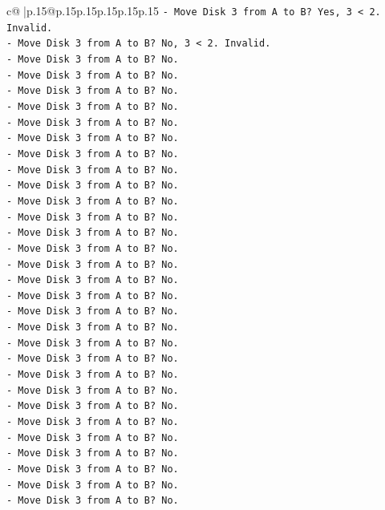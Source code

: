 \documentclass{article}
\begin{document}
{\begin{supertabular}{c@{$\;$}|p{.15\linewidth}@{}p{.15\linewidth}p{.15\linewidth}p{.15\linewidth}p{.15\linewidth}p{.15\linewidth}}
{{{\texttt{{-} Move Disk 3 from A to B? Yes, 3 < 2. Invalid.} \\
\texttt{{-} Move Disk 3 from A to B? No, 3 < 2. Invalid.} \\
\texttt{{-} Move Disk 3 from A to B? No.} \\
\texttt{{-} Move Disk 3 from A to B? No.} \\
\texttt{{-} Move Disk 3 from A to B? No.} \\
\texttt{{-} Move Disk 3 from A to B? No.} \\
\texttt{{-} Move Disk 3 from A to B? No.} \\
\texttt{{-} Move Disk 3 from A to B? No.} \\
\texttt{{-} Move Disk 3 from A to B? No.} \\
\texttt{{-} Move Disk 3 from A to B? No.} \\
\texttt{{-} Move Disk 3 from A to B? No.} \\
\texttt{{-} Move Disk 3 from A to B? No.} \\
\texttt{{-} Move Disk 3 from A to B? No.} \\
\texttt{{-} Move Disk 3 from A to B? No.} \\
\texttt{{-} Move Disk 3 from A to B? No.} \\
\texttt{{-} Move Disk 3 from A to B? No.} \\
\texttt{{-} Move Disk 3 from A to B? No.} \\
\texttt{{-} Move Disk 3 from A to B? No.} \\
\texttt{{-} Move Disk 3 from A to B? No.} \\
\texttt{{-} Move Disk 3 from A to B? No.} \\
\texttt{{-} Move Disk 3 from A to B? No.} \\
\texttt{{-} Move Disk 3 from A to B? No.} \\
\texttt{{-} Move Disk 3 from A to B? No.} \\
\texttt{{-} Move Disk 3 from A to B? No.} \\
\texttt{{-} Move Disk 3 from A to B? No.} \\
\texttt{{-} Move Disk 3 from A to B? No.} \\
\texttt{{-} Move Disk 3 from A to B? No.} \\
\texttt{{-} Move Disk 3 from A to B? No.} \\
\texttt{{-} Move Disk 3 from A to B? No.} \\
\texttt{{-} Move Disk 3 from A to B? No.} \\
\texttt{{-} Move Disk 3 from A to B? No.} \\
}}}
\end{supertabular}}
\end{document}
